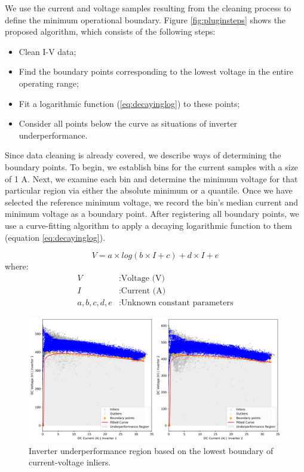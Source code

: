 We use the current and voltage samples resulting from the cleaning process to define the minimum operational boundary. Figure \ref{fig:pluginsteps} shows the proposed algorithm, which consists of the following steps:

\begin{itemize}
	\item Clean I-V data;
	\item Find the boundary points corresponding to the lowest voltage in the entire operating range;
	\item Fit a logarithmic function (\ref{eq:decayinglog}) to these points;
	\item Consider all points below the curve as situations of inverter underperformance.
\end{itemize}


Since data cleaning is already covered, we describe ways of determining the boundary points.
To begin, we establish bins for the current samples with a size of 1 A. Next, we examine each bin and determine the minimum voltage for that particular region via either the absolute minimum or a quantile. Once we have selected the reference minimum voltage, we record the bin's median current and minimum voltage as a boundary point.
After registering all boundary points, we use a curve-fitting algorithm to apply a decaying logarithmic function to them (equation \ref{eq:decayinglog}).

\begin{equation} \label{eq:decayinglog}
    V = a \times log(b \times I + c) + d \times I + e 
\end{equation}
where:
\begin{align*}
    V & : \text{Voltage (V)} \\
    I & : \text{Current (A)} \\
    a,b,c,d,e & : \text{Unknown constant parameters}
\end{align*}

\begin{figure}[h!]
    \centering
    \includegraphics[width=\textwidth]{figures/chapter5/algorithm/30_boundary-1.png}
    \caption{Inverter underperformance region based on the lowest boundary of current-voltage inliers.}
    \label{fig:anomaly_decision_boundary}
\end{figure}

